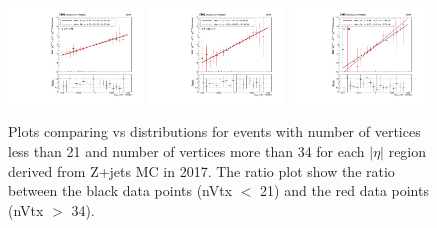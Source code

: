 \begin{figure}[h!]
    \centering
    \includegraphics[width=0.32\textwidth]{images_geofit/nVtx_eta_0_0p9_2017.pdf}
    \includegraphics[width=0.32\textwidth]{images_geofit/nVtx_eta_0p9_1p7_2017.pdf}
    \includegraphics[width=0.32\textwidth]{images_geofit/nVtx_eta_1p7_inf_2017.pdf}
    \caption{Plots comparing \dptoverptsquare vs \dzeroBS distributions for events with number of vertices less than 21 and number of vertices more than 34 for each $|\eta|$ region derived from Z+jets MC in 2017. The ratio plot show the ratio between the black data points (nVtx $<$ 21) and the red data points (nVtx $>$ 34).}
    \label{fig:nVtx_d0_2017}
\end{figure}

